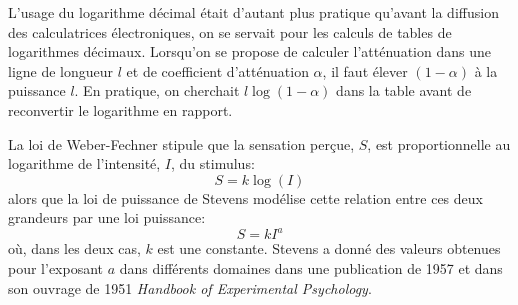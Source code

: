 \begin{histoire}
L'usage du logarithme décimal était d'autant plus pratique qu'avant la diffusion des calculatrices électroniques, on se servait pour les calculs de tables de logarithmes décimaux. Lorsqu'on se propose de calculer l'atténuation dans une ligne de longueur $l$ et de coefficient d'atténuation $\alpha$, il faut élever $(1-\alpha)$ à la puissance $l$. En pratique, on cherchait $l\log(1-\alpha)$ dans la table avant de reconvertir le logarithme en rapport.

\medskip
{}

La loi de Weber-Fechner stipule que la sensation perçue, $S$, est proportionnelle au logarithme de l'intensité, $I$, du stimulus:
\begin{equation}
 S = k\log(I) 
\end{equation}
alors que la loi de puissance de Stevens modélise cette relation entre ces deux grandeurs par une loi puissance:
\begin{equation}
     S = kI^a 
\end{equation}
où, dans les deux cas, $k$ est une constante.
Stevens a donné des valeurs obtenues pour l'exposant $a$ dans différents domaines dans une publication de 1957 et dans son ouvrage de 1951 \emph{Handbook of Experimental Psychology}.
\end{histoire}

